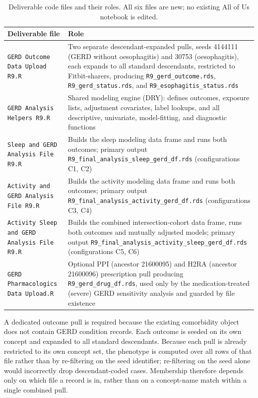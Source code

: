 \documentclass[11pt]{article}
\newcommand{\code}[1]{\texttt{\small #1}}
\begin{document}
\begin{table}[h]
\centering
\footnotesize
\begin{tabular}{@{}lp{7.6cm}@{}}
\toprule
Deliverable file & Role \\
\midrule
\code{GERD Outcome Data Upload R9.R} &
Two separate descendant-expanded pulls, seeds 4144111 (GERD without oesophagitis) and 30753 (oesophagitis), each
expands to all standard descendants, restricted to Fitbit-sharers, producing
\code{R9_gerd_outcome.rds}, \code{R9_gerd_status.rds}, and \code{R9_esophagitis_status.rds} \\
\addlinespace
\code{GERD Analysis Helpers R9.R} &
Shared modeling engine (DRY): defines outcomes, exposure lists, adjustment covariates, label lookups,
and all descriptive, univariate, model-fitting, and diagnostic functions \\
\addlinespace
\code{Sleep and GERD Analysis File R9.R} &
Builds the sleep modeling data frame and runs both outcomes; primary output
\code{R9_final_analysis_sleep_gerd_df.rds} (configurations C1, C2) \\
\addlinespace
\code{Activity and GERD Analysis File R9.R} &
Builds the activity modeling data frame and runs both outcomes; primary output
\code{R9_final_analysis_activity_gerd_df.rds} (configurations C3, C4) \\
\addlinespace
\code{Activity Sleep and GERD Analysis File R9.R} &
Builds the combined intersection-cohort data frame, runs both outcomes and mutually adjusted models;
primary output \code{R9_final_analysis_activity_sleep_gerd_df.rds} (configurations C5, C6) \\
\addlinespace
\code{GERD Pharmacologics Data Upload.R} &
Optional PPI (ancestor 21600095) and H2RA (ancestor 21600096) prescription pull producing
\code{R9_gerd_drug_df.rds}, used only by the medication-treated (severe) GERD sensitivity analysis
and guarded by file existence \\
\bottomrule
\end{tabular}
\caption{Deliverable code files and their roles. All six files are new; no existing All of Us
notebook is edited.}
\label{tab:deliverables}
\end{table}

A dedicated outcome pull is required because the existing comorbidity object does not contain GERD
condition records. Each outcome is seeded on its own concept and expanded to all standard descendants.
Because each pull is already restricted to its own concept set, the phenotype is computed over all rows
of that file rather than by re-filtering on the seed identifier; re-filtering on the seed alone would
incorrectly drop descendant-coded cases. Membership therefore depends only on which file a record is in,
rather than on a concept-name match within a single combined pull.
\end{document}
